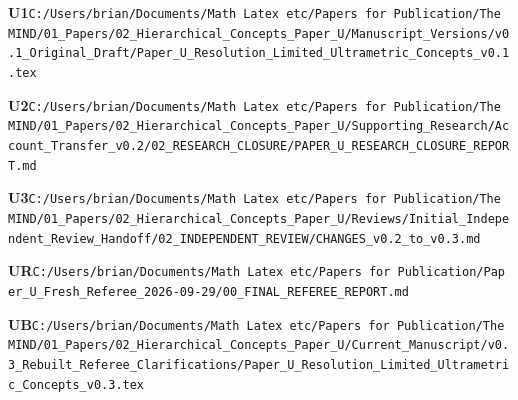 \documentclass[10pt,letterpaper]{article}
\begin{document}
\noindent\textbf{U1}\quad \texttt{C:/\allowbreak{}Users/\allowbreak{}brian/\allowbreak{}Documents/\allowbreak{}Math\ Latex\ etc/\allowbreak{}Papers\ for\ Publication/\allowbreak{}The\ MIND/\allowbreak{}01\_\allowbreak{}Papers/\allowbreak{}02\_\allowbreak{}Hierarchical\_\allowbreak{}Concepts\_\allowbreak{}Paper\_\allowbreak{}U/\allowbreak{}Manuscript\_\allowbreak{}Versions/\allowbreak{}v0.1\_\allowbreak{}Original\_\allowbreak{}Draft/\allowbreak{}Paper\_\allowbreak{}U\_\allowbreak{}Resolution\_\allowbreak{}Limited\_\allowbreak{}Ultrametric\_\allowbreak{}Concepts\_\allowbreak{}v0.1.tex}\par
\noindent\textbf{U2}\quad \texttt{C:/\allowbreak{}Users/\allowbreak{}brian/\allowbreak{}Documents/\allowbreak{}Math\ Latex\ etc/\allowbreak{}Papers\ for\ Publication/\allowbreak{}The\ MIND/\allowbreak{}01\_\allowbreak{}Papers/\allowbreak{}02\_\allowbreak{}Hierarchical\_\allowbreak{}Concepts\_\allowbreak{}Paper\_\allowbreak{}U/\allowbreak{}Supporting\_\allowbreak{}Research/\allowbreak{}Account\_\allowbreak{}Transfer\_\allowbreak{}v0.2/\allowbreak{}02\_\allowbreak{}RESEARCH\_\allowbreak{}CLOSURE/\allowbreak{}PAPER\_\allowbreak{}U\_\allowbreak{}RESEARCH\_\allowbreak{}CLOSURE\_\allowbreak{}REPORT.md}\par
\noindent\textbf{U3}\quad \texttt{C:/\allowbreak{}Users/\allowbreak{}brian/\allowbreak{}Documents/\allowbreak{}Math\ Latex\ etc/\allowbreak{}Papers\ for\ Publication/\allowbreak{}The\ MIND/\allowbreak{}01\_\allowbreak{}Papers/\allowbreak{}02\_\allowbreak{}Hierarchical\_\allowbreak{}Concepts\_\allowbreak{}Paper\_\allowbreak{}U/\allowbreak{}Reviews/\allowbreak{}Initial\_\allowbreak{}Independent\_\allowbreak{}Review\_\allowbreak{}Handoff/\allowbreak{}02\_\allowbreak{}INDEPENDENT\_\allowbreak{}REVIEW/\allowbreak{}CHANGES\_\allowbreak{}v0.2\_\allowbreak{}to\_\allowbreak{}v0.3.md}\par
\noindent\textbf{UR}\quad \texttt{C:/\allowbreak{}Users/\allowbreak{}brian/\allowbreak{}Documents/\allowbreak{}Math\ Latex\ etc/\allowbreak{}Papers\ for\ Publication/\allowbreak{}Paper\_\allowbreak{}U\_\allowbreak{}Fresh\_\allowbreak{}Referee\_\allowbreak{}2026-\allowbreak{}09-\allowbreak{}29/\allowbreak{}00\_\allowbreak{}FINAL\_\allowbreak{}REFEREE\_\allowbreak{}REPORT.md}\par
\noindent\textbf{UB}\quad \texttt{C:/\allowbreak{}Users/\allowbreak{}brian/\allowbreak{}Documents/\allowbreak{}Math\ Latex\ etc/\allowbreak{}Papers\ for\ Publication/\allowbreak{}The\ MIND/\allowbreak{}01\_\allowbreak{}Papers/\allowbreak{}02\_\allowbreak{}Hierarchical\_\allowbreak{}Concepts\_\allowbreak{}Paper\_\allowbreak{}U/\allowbreak{}Current\_\allowbreak{}Manuscript/\allowbreak{}v0.3\_\allowbreak{}Rebuilt\_\allowbreak{}Referee\_\allowbreak{}Clarifications/\allowbreak{}Paper\_\allowbreak{}U\_\allowbreak{}Resolution\_\allowbreak{}Limited\_\allowbreak{}Ultrametric\_\allowbreak{}Concepts\_\allowbreak{}v0.3.tex}\par
\end{document}
